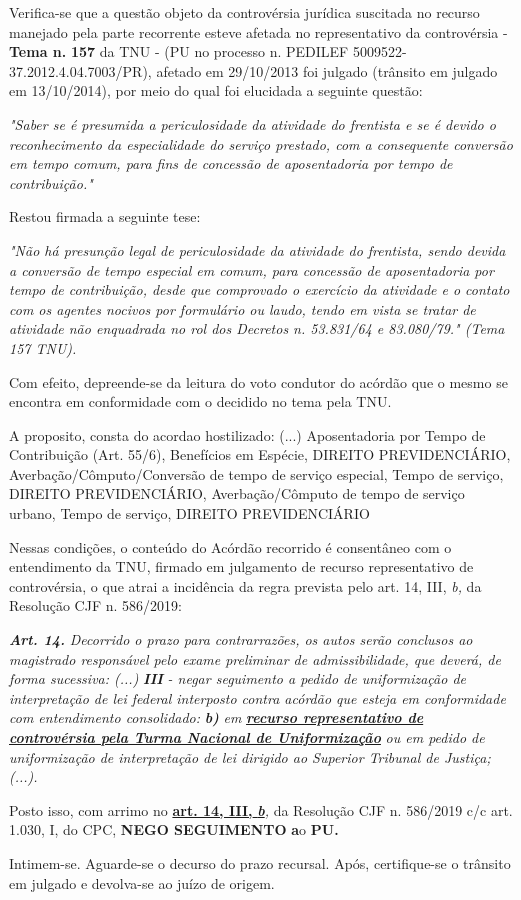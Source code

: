 \documentclass[12pt]{article}
\begin{document}
\justifying
\noindent Verifica-se que a questão objeto da controvérsia jurídica suscitada no recurso manejado pela parte recorrente esteve afetada no representativo da controvérsia - \textbf{Tema n. }\textbf{157} da TNU - (PU no processo n. PEDILEF 5009522-37.2012.4.04.7003/PR),  afetado em 29/10/2013 foi julgado (trânsito em julgado em 13/10/2014), por meio do qual foi elucidada a seguinte questão:

\noindent \textit{"Saber se é presumida a periculosidade da atividade do frentista e se é devido o reconhecimento da especialidade do serviço prestado, com a consequente conversão em tempo comum, para fins de concessão de aposentadoria por tempo de contribuição."}

\noindent Restou firmada a seguinte tese:

\noindent \textit{"Não há presunção legal de periculosidade da atividade do frentista, sendo devida a conversão de tempo especial em comum, para concessão de aposentadoria por tempo de contribuição, desde que comprovado o exercício da atividade e o contato com os agentes nocivos por formulário ou laudo, tendo em vista se tratar de atividade não enquadrada no rol dos Decretos n. 53.831/64 e 83.080/79." (Tema 157 TNU).}

\noindent Com efeito, depreende-se da leitura do voto condutor do acórdão que o mesmo se encontra em conformidade com o decidido no  tema pela TNU.

\noindent A proposito, consta do acordao hostilizado: (...) Aposentadoria por Tempo de Contribuição (Art. 55/6), Benefícios em Espécie, DIREITO PREVIDENCIÁRIO, Averbação/Cômputo/Conversão de tempo de serviço especial, Tempo de serviço, DIREITO PREVIDENCIÁRIO, Averbação/Cômputo de tempo de serviço urbano, Tempo de serviço, DIREITO PREVIDENCIÁRIO

\noindent Nessas condições, o conteúdo do Acórdão recorrido é consentâneo com o entendimento da TNU, firmado em julgamento de recurso representativo de controvérsia, o que atrai a incidência da regra prevista pelo art. 14, III, \textit{b,} da Resolução CJF n. 586/2019:

\noindent \textit{\textbf{Art. 14.}}\textit{ Decorrido o prazo para contrarrazões, os autos serão conclusos ao magistrado responsável pelo exame preliminar de admissibilidade, que deverá, de forma sucessiva: (...) }\textit{\textbf{III }}\textit{- negar seguimento a pedido de uniformização de interpretação de lei federal interposto contra acórdão que esteja em conformidade com entendimento consolidado: }\textit{\textbf{b)}}\textit{ em }\uline{\textit{\textbf{recurso representativo de controvérsia pela Turma Nacional de Uniformização}}}\textit{ ou em pedido de uniformização de interpretação de lei dirigido ao Superior Tribunal de Justiça;(...).}

\noindent Posto isso, com arrimo no \uline{\textbf{art. 14, III, }}\uline{\textit{\textbf{b}}}\textit{,} da Resolução CJF n. 586/2019 c/c art. 1.030, I, do CPC, \textbf{NEGO SEGUIMENTO }\textbf{a}o\textbf{ PU}\textbf{.}

\noindent Intimem-se. Aguarde-se o decurso do prazo recursal. Após, certifique-se o trânsito em julgado e devolva-se ao juízo de origem.
\end{document}
